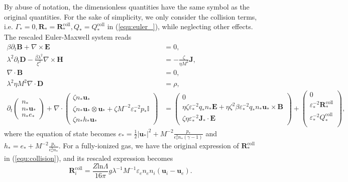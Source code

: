 \documentclass{article}
\begin{document}
By abuse of notation, the dimensionless quantities have the same symbol as the original quantities. For the sake of simplicity, we only consider the collision terms, i.e. $\Gamma_* = 0, \mathbf{R}_* = \mathbf{R}_*^\text{coll}, Q_* = Q_*^\text{coll}$ in (\ref{equ:euler_}), while neglecting other effects. The rescaled Euler-Maxwell system reads
\begin{subequations}
\begin{align}
    \beta \partial_t \mathbf{B} + \nabla \times \mathbf{E} &= 0, \label{equ:maxwell_faraday_rescalling} \\ 
    \lambda^2 \partial_t \mathbf{D} - \frac{\beta \lambda^2}{\xi^2}\nabla \times \mathbf{H} &= - \frac{\zeta}{\eta M^2}\mathbf{J}, \label{equ:maxwell_ampere_rescalling} \\
    \nabla \cdot \mathbf{B} &= 0,  \label{equ:maxwell_gauss_B_rescalling}\\
    \lambda^2 \eta M^2 \nabla \cdot \mathbf{D} &= \rho, \label{equ:maxwell_gauss_D_rescalling} \\
    \partial_t
    \begin{pmatrix}
    n_* \\
    n_* \mathbf{u}_* \\
    n_* e_*
    \end{pmatrix}
    + \nabla \cdot
    \begin{pmatrix}
    \zeta n_* \mathbf{u}_* \\
    \zeta n_* \mathbf{u}_* \otimes \mathbf{u}_* + \zeta M^{-2} \varepsilon_*^{-2} p_*\mathbb{I} \\
    \zeta n_* h_* \mathbf{u}_*
    \end{pmatrix}
    &=
    \begin{pmatrix}
    0 \\
    \eta \zeta \varepsilon_*^{-2} q_* n_*\mathbf{E} + \eta \zeta^2 \beta \varepsilon_*^{-2} q_* n_* \mathbf{u}_* \times \mathbf{B} \\
    \zeta \eta \varepsilon_*^{-2} \mathbf{J}_* \cdot \mathbf{E}
    \end{pmatrix} +
    \begin{pmatrix}
    0 \\
    \varepsilon_*^{-2}\mathbf{R}_*^{\text{coll}} \\
    \varepsilon_*^{-2}Q_*^{\text{coll}} \\
    \end{pmatrix}, \label{equ:euler_rescalling}
\end{align}
\end{subequations}
where the equation of state becomes $e_* = \frac{1}{2}|\mathbf{u_*}|^2 + M^{-2}\frac{p_*}{\epsilon^2_* n_* (\gamma - 1)}$ and $h_* = e_* + M^{-2}\frac{p_*}{\epsilon^2_* n_*}$. For a fully-ionized gas, we have the original expression of $\mathbf{R}_*^{\text{coll}}$ in (\ref{equ:collision}), and its rescaled expression becomes
\begin{equation}
    \mathbf{R}_i^{\text{coll}} = \frac{Z\text{ln}\Lambda}{16\pi}g\lambda^{-1}M^{-1}\varepsilon_en_en_i(\mathbf{u}_i - \mathbf{u}_e). \label{equ:rescaling_friction}
\end{equation}
\end{document}
